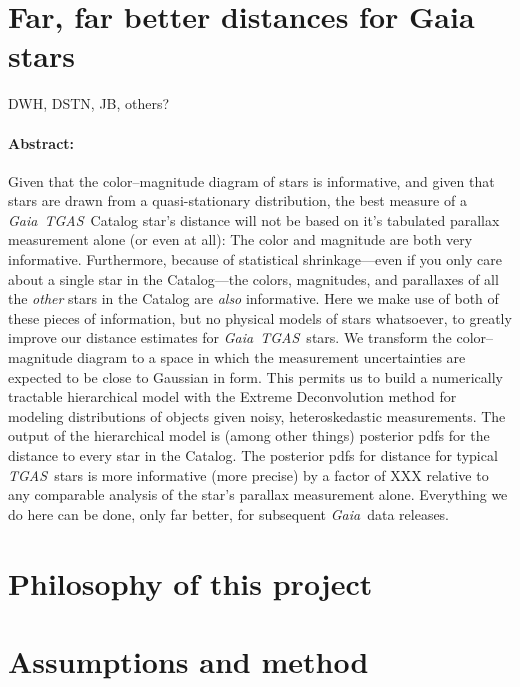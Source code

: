 \documentclass[12pt]{article}
\newcommand{\project}[1]{\textsl{#1}}
\newcommand{\acronym}[1]{\small{#1}}
\newcommand{\gaia}{\project{Gaia}}
\newcommand{\tgas}{\project{\acronym{TGAS}}}
\begin{document}
\section*{Far, far better distances for Gaia stars}

\noindent
DWH, DSTN, JB, others?

\paragraph{Abstract:}
Given that the color--magnitude diagram of stars is informative, and
given that stars are drawn from a quasi-stationary distribution, the
best measure of a \gaia\ \tgas\ Catalog star's distance will not be based on
it's tabulated parallax measurement alone (or even at all):
The color and magnitude are both very informative.
Furthermore, because of statistical shrinkage---even if you
only care about a single star in the Catalog---the colors, magnitudes,
and parallaxes of all the \emph{other} stars in the Catalog are \emph{also}
informative.
Here we make use of both of these pieces of information, but no
physical models of stars whatsoever, to greatly improve our distance
estimates for \gaia\ \tgas\ stars.
We transform the color--magnitude diagram to a space in which the
measurement uncertainties are expected to be close to Gaussian in
form.
This permits us to build a numerically tractable hierarchical model
with the Extreme Deconvolution method for modeling distributions of
objects given noisy, heteroskedastic measurements.
The output of the hierarchical model is (among other things) posterior
pdfs for the distance to every star in the Catalog.
The posterior pdfs for distance for typical \tgas\ stars is more
informative (more precise) by a factor of XXX relative to any
comparable analysis of the star's parallax measurement alone.
Everything we do here can be done, only far better, for subsequent
\gaia\ data releases.

\section{Philosophy of this project}

\section{Assumptions and method}
\end{document}
